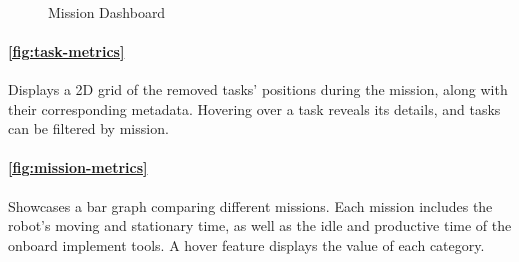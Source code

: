 \begin{figure}[htb]
    \myfloatalign
     \quad
     \\
    \caption{Mission Dashboard}\label{fig:mission-dashboard}
\end{figure}

\paragraph{\autoref{fig:task-metrics}} Displays a 2D grid of the removed tasks' positions during the mission, along with their corresponding metadata. Hovering over a task reveals its details, and tasks can be filtered by mission.

\paragraph{\autoref{fig:mission-metrics}} Showcases a bar graph comparing different missions. Each mission includes the robot's moving and stationary time, as well as the idle and productive time of the onboard implement tools. A hover feature displays the value of each category.


